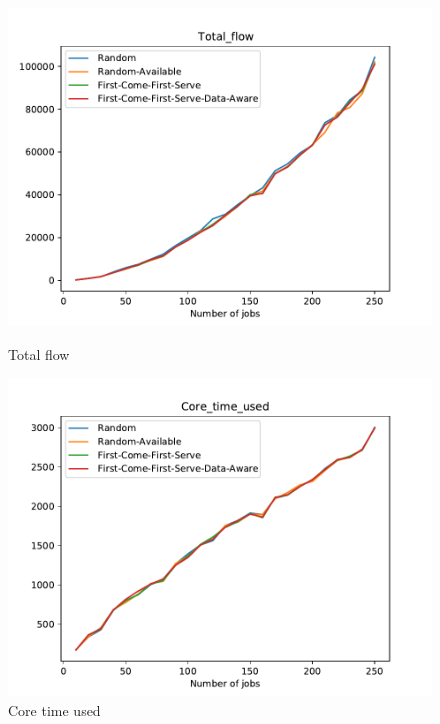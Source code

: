 \documentclass[a4paper]{article}
\begin{document}
\begin{figure}[ht]
\begin{minipage}[b]{0.5\linewidth}
    \centering
    \includegraphics[width=1.11\linewidth]{MBSS/plot/Total_flow.pdf} 
    \caption{Total flow} 
    \vspace{4ex}
  \end{minipage}%
  \begin{minipage}[b]{0.5\linewidth}
    \centering
    \includegraphics[width=1.11\linewidth]{MBSS/plot/Core_time_used.pdf} 
    \caption{Core time used} 
    \vspace{4ex}
  \end{minipage} 
\end{figure}
\end{document}
